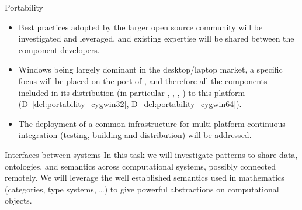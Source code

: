 \begin{Workpackage}{\thewpno}
\begin{task}{Portability}
    \begin{itemize}
    \item Best practices adopted by the larger open source community
      will be investigated and leveraged, and existing expertise will
      be shared between the component developers.
    \item Windows being largely dominant in the desktop/laptop market,
      a specific focus will be placed on the port of \Sage, and
      therefore all the components included in its distribution (in
      particular \PariGP, \GAP, \Singular, \Linbox) to this platform
      (D~\ref{del:portability_cygwin32}, D~\ref{del:portability_cygwin64}).
    \item The deployment of a common infrastructure for multi-platform
      continuous integration (testing, building and distribution) will
      be addressed.
    \end{itemize}

  \end{task}

  \begin{task}{Interfaces between systems}
    In this task we will investigate patterns to share data,
    ontologies, and semantics across computational systems, possibly
    connected remotely.  We will leverage the well established
    semantics used in mathematics (categories, type systems, \dots) to
    give powerful abstractions on computational objects.
    

\end{task}
\end{Workpackage}

